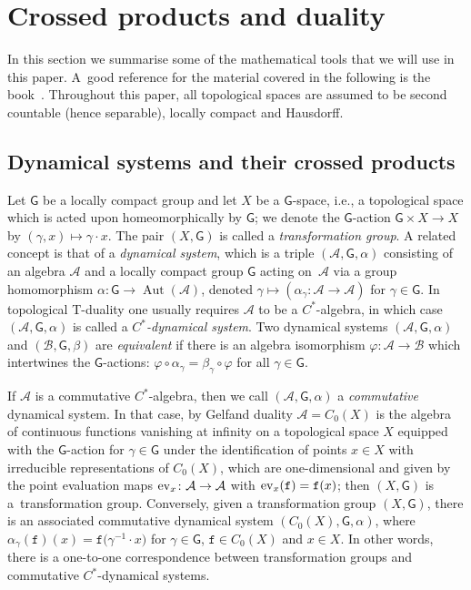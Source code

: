 \documentclass[pdftex]{sigma}
\numberwithin{equation}{section}
\newcommand{\sfG}{\mathsf{G}}
\newcommand{\Aut}{\operatorname{Aut}}
\def\alg{{\mathcal A}}
\def\balg{{\mathcal B}}
\begin{document}
\section{Crossed products and duality\label{sec:NAdef}}

In this section we summarise some of the mathematical tools that we
will use in this paper. A~good reference for the material covered in
the following is the book~\cite{Williams2007}. Throughout this paper,
all topological spaces are assumed to be second countable (hence
separable), locally compact and Hausdorff.

\subsection{Dynamical systems and their crossed products}

Let $\sfG$ be a locally compact group and let $X$ be a $\sfG$-space, i.e., a
topological space which is acted
upon
homeomorphically by $\sfG$; we denote the $\sfG$-action $\sfG\times
X\to X$ by $(\gamma,x)\mapsto\gamma\cdot x$. The pair $(X,\sfG)$ is
called a \emph{transformation group}.
 A related concept is that of a
\emph{dynamical system}, which is a triple $(\alg,\sfG,\alpha)$
consisting of an algebra $\alg$ and a locally compact group $\sfG$ acting
on~$\alg$ via a group homomorphism $\alpha\colon \sfG\to\Aut (\alg)$,
denoted $\gamma\mapsto(\alpha_\gamma\colon \alg\to\alg)$ for $\gamma\in
\sfG$. In topological
T-duality one usually requires $\alg$ to be a $C^*$-algebra, in which
case $(\alg,\sfG,\alpha)$ is called a \emph{$C^*$-dynamical
 system}. Two dynamical systems $(\alg,\sfG,\alpha)$ and $(\balg,\sfG,\beta)$ are
\emph{equivalent} if there is an algebra isomorphism
$\varphi\colon \alg\to\balg$ which intertwines the $\sfG$-actions: $\varphi\circ\alpha_\gamma =
\beta_\gamma\circ\varphi$ for all $\gamma\in \sfG$.

If $\alg$ is a commutative $C^*$-algebra, then we call $(\alg,\sfG,\alpha)$ a
\emph{commutative} dynamical system. In that case, by Gelfand duality
$\alg=C_0(X)$ is the algebra of continuous functions vanishing at
infinity on a
topological space $X$
equipped with the $\sfG$-action  for $\gamma\in \sfG$ under
the identification of points $x\in X$ with irreducible representations
of $C_0(X)$, which are one-dimensional and given by the point evaluation
maps ${\rm ev}_x\colon \alg\to\alg$ with ${\rm ev}_x(\mathtt{f})=\mathtt{f}(x)$; then
$(X,\sfG)$ is a~transformation group. Conversely, given a transformation
group $(X,\sfG)$, there is an associated commutative dynamical system
$(C_0(X), \sfG,\alpha)$, where $\alpha_\gamma(\mathtt{f})(x)=\mathtt{f}\big(\gamma^{-1}\cdot x\big)$ for $\gamma\in
\sfG$, $\mathtt{f}\in C_0(X)$ and $x\in X$. In other words, there is a one-to-one
correspondence between transformation groups and commutative $C^*$-dynamical
systems.
\end{document}
